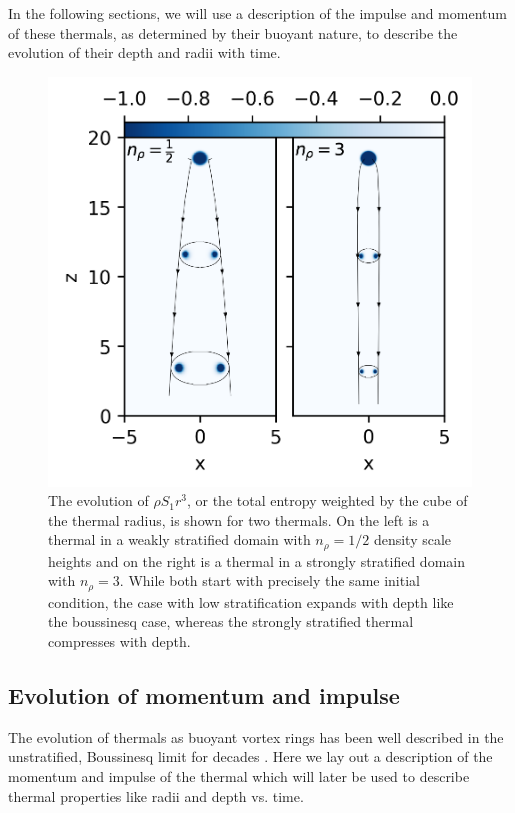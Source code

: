 \documentclass[twocolumn, amsmath, amsfonts, amssymb, trackchanges]{aastex62}
\begin{document}
In the following sections, we will use a description of the impulse and momentum of these
thermals, as determined by their buoyant nature, to describe the evolution of their depth
and radii with time.

\begin{figure}[t!]
    \includegraphics[width=\columnwidth]{evolution_colormeshes.png}
    \caption{The evolution of $\rho S_1 r^3$, or the total entropy weighted by
	the cube of the thermal radius, is shown for two thermals. On the left is
	a thermal in a weakly stratified domain with $n_\rho = 1/2$ density scale heights and 
	on the right is a thermal in a strongly stratified domain with $n_\rho = 3$.
	While both start with precisely the same initial condition, the case with low stratification
	expands with depth like the boussinesq case, whereas the strongly stratified thermal
	compresses with depth.
    \label{fig:evolution_colormeshes} }
\end{figure}


\subsection{Evolution of momentum and impulse}
The evolution of thermals as buoyant vortex rings has been well described in
the unstratified, Boussinesq limit for decades 
\citep[see e.g.][for a description and sources]{lecoanet&jeevanjee2018}.
Here we lay out a description of the momentum and
impulse of the thermal which will later be used 
to describe thermal properties like radii and depth vs. time.
\end{document}
